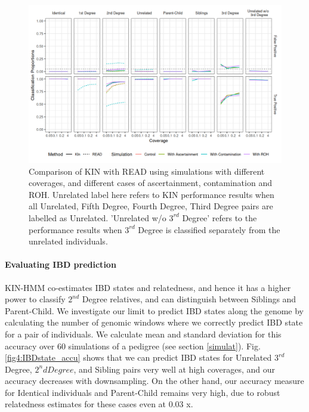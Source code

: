 \documentclass[12pt, letterpaper]{article}
\begin{document}
\begin{figure}[h!]
    \includegraphics[width=16cm]{plots/plotimg/comparison_plot.png}
    \centering
    \caption{Comparison of KIN with READ using simulations with different coverages, and different cases of ascertainment, contamination and ROH. Unrelated label here refers to KIN performance results when all Unrelated, Fifth Degree, Fourth Degree, Third Degree pairs are labelled as Unrelated. 'Unrelated w/o $3^{rd}$ Degree' refers to the performance results when $3^{rd}$ Degree is classified separately from the unrelated individuals.}
    \label{fig3:Comparison_READ_KIN}
\end{figure}

\paragraph{Evaluating IBD prediction}
KIN-HMM co-estimates IBD states and relatedness, and hence it has a higher power to classify $2^{nd}$ Degree relatives, and can distinguish between Siblings and Parent-Child. We investigate our limit to predict IBD states along the genome by calculating the number of genomic windows where we correctly  predict IBD state for a pair of individuals. We calculate mean and standard deviation for this accuracy over 60 simulations of a pedigree (see section \ref{simulat}). Fig. \ref{fig4:IBDstate_accu} shows that we can predict IBD states for Unrelated $3^{rd}$ Degree, $2^nd Degree$, and Sibling pairs very well at high coverages, and our accuracy decreases with downsampling. On the other hand, our accuracy measure for Identical individuals and Parent-Child remains very high, due to robust relatedness estimates for these cases even at 0.03 x.  
\end{document}

